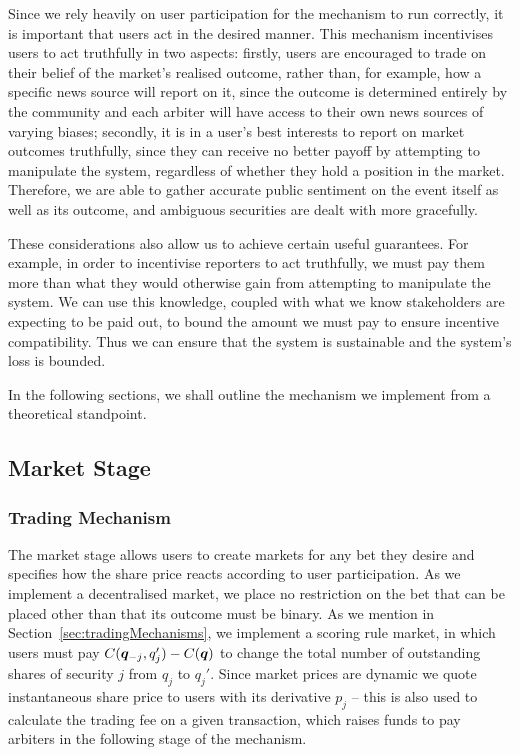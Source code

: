 Since we rely heavily on user participation for the mechanism to run correctly,
it is important that users act in the desired manner. This mechanism
incentivises users to act truthfully in two aspects: firstly, users are
encouraged to trade on their belief of the market's realised outcome, rather
than, for example, how a specific news source will report on it, since the
outcome is determined entirely by the community and each arbiter will have
access to their own news sources of varying biases; secondly, it is in a user's
best interests to report on market outcomes truthfully, since they can receive
no better payoff by attempting to manipulate the system, regardless of whether
they hold a position in the market. Therefore, we are able to gather accurate
public sentiment on the event itself as well as its outcome, and ambiguous
securities are dealt with more gracefully.

These considerations also allow us to achieve certain useful guarantees. For
example, in order to incentivise reporters to act truthfully, we must pay them
more than what they would otherwise gain from attempting to manipulate the
system. We can use this knowledge, coupled with what we know stakeholders are
expecting to be paid out, to bound the amount we must pay to ensure incentive
compatibility. Thus we can ensure that the system is sustainable and the
system's loss is bounded.

In the following sections, we shall outline the mechanism we implement from a
theoretical standpoint. 

\subsection{Market Stage}

\label{sec:marketStage}

\subsubsection{Trading Mechanism}

The market stage allows users to create markets for any bet they desire and
specifies how the share price reacts according to user participation. As we
implement a decentralised market, we place no restriction on the bet that can
be placed other than that its outcome must be binary. As we mention in
Section~\ref{sec:tradingMechanisms}, we implement a scoring rule market, in
which users must pay $C(\bm{q}_{-j}, q_j')-C(\bm{q})$ to change the total
number of outstanding shares of security $j$ from $q_j$ to $q_j'$.  Since
market prices are dynamic we quote instantaneous share price to users with its
derivative $p_j$ -- this is also used to calculate the trading fee on a given
transaction, which raises funds to pay arbiters in the following stage of the
mechanism.

